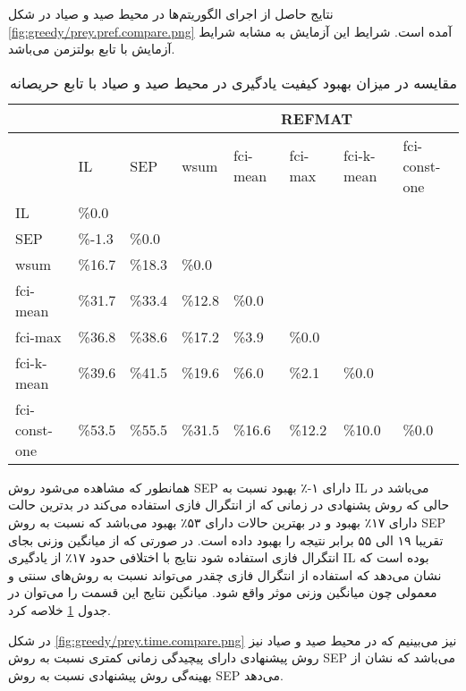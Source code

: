  نتایج حاصل از اجرای الگوریتم‌ها در محیط صید و صیاد در شکل
\ref{fig:greedy/prey.pref.compare.png}
آمده است. شرایط این آزمایش به مشابه شرایط آزمایش با تابع بولتزمن می‌باشد.


\begin{table}[h!]
\centering
\caption{مقایسه در میزان بهبود کیفیت یادگیری در محیط صید و صیاد با تابع حریصانه}\label{tab:prey_pref_compare_greedy}
\begin{latin}
\begin{tabular}{|*8{l|}}
\hline
\multicolumn{3}{|c|}{}& \multicolumn{5}{c|}{REFMAT}
\\\hline
& IL & SEP & wsum & fci-mean & fci-max & fci-k-mean & fci-const-one
\\\hline
IL & \%0.0 & & & & & &
\\\hline
SEP & \%-1.3 & \%0.0 & & & & &
\\\hline
wsum & \%16.7 & \%18.3 & \%0.0 & & & &
\\\hline
fci-mean & \%31.7 & \%33.4 & \%12.8 & \%0.0 & & &
\\\hline
fci-max & \%36.8 & \%38.6 & \%17.2 & \%3.9 & \%0.0 & &
\\\hline
fci-k-mean & \%39.6 & \%41.5 & \%19.6 & \%6.0 & \%2.1 & \%0.0 &
\\\hline
fci-const-one & \%53.5 & \%55.5 & \%31.5 & \%16.6 & \%12.2 & \%10.0 & \%0.0
\\\hline
\end{tabular}
\end{latin}
\end{table}

همانطور که مشاهده می‌شود روش SEP دارای ۱-٪ بهبود نسبت به IL می‌باشد در حالی که روش پشنهادی در زمانی که از انتگرال فازی استفاده می‌کند در بدترین حالت دارای ۱۷٪ بهبود و در بهترین حالات دارای ۵۳٪ بهبود می‌باشد که نسبت به روش SEP تقریبا ۱۹ الی ۵۵ برابر نتیجه را بهبود داده است. در صورتی که از میانگین وزنی بجای انتگرال فازی استفاده شود نتایج با اختلافی حدود ۱۷٪  از یادگیری IL بوده است که نشان ‌می‌دهد که استفاده از انتگرال فازی چقدر می‌تواند نسبت به روش‌های سنتی و معمولی چون میانگین وزنی موثر واقع شود. میانگین نتایج این قسمت را می‌توان در جدول
\ref{tab:prey_pref_compare_greedy}
خلاصه کرد.

 در شکل
\ref{fig:greedy/prey.time.compare.png}
نیز می‌بینیم که در محیط صید و صیاد نیز روش پیشنهادی دارای پیچیدگی زمانی کمتری نسبت به روش SEP می‌باشد که نشان از بهینه‌گی روش پیشنهادی نسبت به روش SEP می‌دهد.


